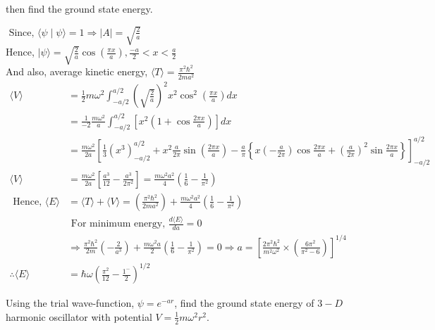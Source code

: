 \begin{enumerate}
\begin{minipage}{\textwidth}
$$	$$
	then find the ground state energy.
\end{minipage}
\begin{answer}
$\text { Since, }\langle\psi \mid \psi\rangle=1 \Rightarrow|A|=\sqrt{\frac{2}{a}}$\\
Hence, $|\psi\rangle=\sqrt{\frac{2}{a}} \cos \left(\frac{\pi x}{a}\right), \frac{-a}{2}<x<\frac{a}{2}$\\
And also, average kinetic energy, $\langle T\rangle=\frac{\pi^{2} \hbar^{2}}{2 m a^{2}}$	\\
\begin{align*}
\langle V\rangle&=\frac{1}{2} m \omega^{2} \int_{-a / 2}^{a / 2}\left(\sqrt{\frac{2}{a}}\right)^{2} x^{2} \cos ^{2}\left(\frac{\pi x}{a}\right) d x\\
&=\frac{1}{-2} \frac{m \omega^{2}}{a} \int_{-a / 2}^{a / 2}\left[x^{2}\left(1+\cos \frac{2 \pi x}{a}\right)\right] d x\\
&=\frac{m \omega^{2}}{2 a}\left[\frac{1}{3}\left(x^{3}\right)_{-a / 2}^{a / 2}+x^{2} \frac{a}{2 \pi} \sin \left(\frac{2 \pi x}{a}\right)-\frac{a}{\pi}\left\{x\left(-\frac{a}{2 \pi}\right) \cos \frac{2 \pi x}{a}+\left(\frac{a}{2 \pi}\right)^{2} \sin \frac{2 \pi x}{a}\right\}\right]_{-a / 2}^{a / 2}\\
\langle V\rangle&=\frac{m \omega^{2}}{2 a}\left[\frac{a^{3}}{12}-\frac{a^{3}}{2 \pi^{2}}\right]=\frac{m \omega^{2} a^{2}}{4}\left(\frac{1}{6}-\frac{1}{\pi^{2}}\right)\\
\text { Hence, }\langle E\rangle&=\langle T\rangle+\langle V\rangle=\left(\frac{\pi^{2} \hbar^{2}}{2 m a^{2}}\right)+\frac{m \omega^{2} a^{2}}{4}\left(\frac{1}{6}-\frac{1}{\pi^{2}}\right)\\
&\text { For minimum energy, } \frac{d\langle E\rangle}{d a}=0\\
&\Rightarrow \frac{\pi^{2} \hbar^{2}}{2 m}\left(-\frac{2}{a^{3}}\right)+\frac{m \omega^{2} a}{2}\left(\frac{1}{6}-\frac{1}{\pi^{2}}\right)=0 \Rightarrow a=\left[\frac{2 \pi^{2} \hbar^{2}}{m^{2} \omega^{2}} \times\left(\frac{6 \pi^{2}}{\pi^{2}-6}\right)\right]^{1 / 4} \\
\therefore\langle E\rangle&=\hbar \omega\left(\frac{\pi^{2}}{12}-\frac{1^{-}}{2}\right)^{1 / 2}
\end{align*}
\end{answer}
	\begin{minipage}{\textwidth}
	\item Using the trial wave-function, $\psi=e^{-a r}$, find the ground state energy of $3-D$ harmonic oscillator with potential $V=\frac{1}{2} m \omega^{2} r^{2}$.

\end{minipage}
\end{enumerate}
